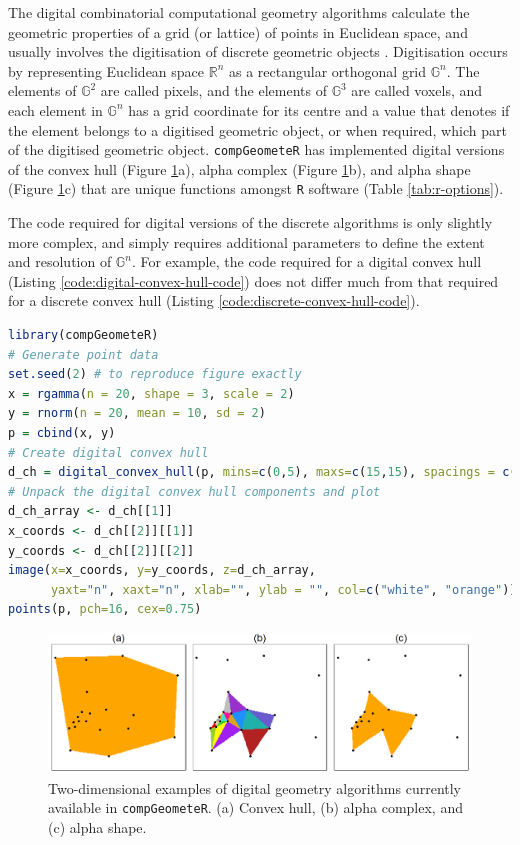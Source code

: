 \documentclass[12pt, a4paper]{article}
\begin{document}
The digital combinatorial computational geometry algorithms calculate the geometric properties of a grid (or lattice) of points in Euclidean space, and usually involves the digitisation of discrete geometric objects \citep{rosenfeld-1989}.  Digitisation occurs by representing Euclidean space $\mathbb{R}^n$ as a rectangular orthogonal grid $\mathbb{G}^n$.  The elements of $\mathbb{G}^2$ are called pixels, and the elements of $\mathbb{G}^3$ are called voxels, and each element in $\mathbb{G}^n$ has a grid coordinate for its centre \citep{klette-2004} and a value that denotes if the element belongs to a digitised geometric object, or when required, which part of the digitised geometric object.  \texttt{compGeometeR} has implemented digital versions of the convex hull (Figure \ref{fig:digital-algorithms}a), alpha complex (Figure \ref{fig:digital-algorithms}b), and alpha shape (Figure \ref{fig:digital-algorithms}c) that are unique functions amongst \texttt{R} software (Table \ref{tab:r-options}).

The code required for digital versions of the discrete algorithms is only slightly more complex, and simply requires additional parameters to define the extent and resolution of $\mathbb{G}^n$.  For example, the code required for a digital convex hull (Listing \ref{code:digital-convex-hull-code}) does not differ much from that required for a discrete convex hull (Listing \ref{code:discrete-convex-hull-code}).

\begin{lstlisting}[language=R, caption=Example \texttt{R} code to create a digital convex hull (Figure \ref{fig:digital-algorithms}a) with \texttt{compGeometeR}, label={code:digital-convex-hull-code}]
library(compGeometeR)
# Generate point data
set.seed(2) # to reproduce figure exactly
x = rgamma(n = 20, shape = 3, scale = 2)
y = rnorm(n = 20, mean = 10, sd = 2)
p = cbind(x, y)
# Create digital convex hull
d_ch = digital_convex_hull(p, mins=c(0,5), maxs=c(15,15), spacings = c(0.05,0.05))
# Unpack the digital convex hull components and plot
d_ch_array <- d_ch[[1]]
x_coords <- d_ch[[2]][[1]]
y_coords <- d_ch[[2]][[2]]
image(x=x_coords, y=y_coords, z=d_ch_array, 
      yaxt="n", xaxt="n", xlab="", ylab = "", col=c("white", "orange"))
points(p, pch=16, cex=0.75)
\end{lstlisting}

\begin{figure}[ht]
\centering
\includegraphics{figures/digital-algorithms/digital-algorithms.png}
\caption{Two-dimensional examples of digital geometry algorithms currently available in \texttt{compGeometeR}. (a) Convex hull, (b) alpha complex, and (c) alpha shape.}
\label{fig:digital-algorithms}
\end{figure}
\end{document}

